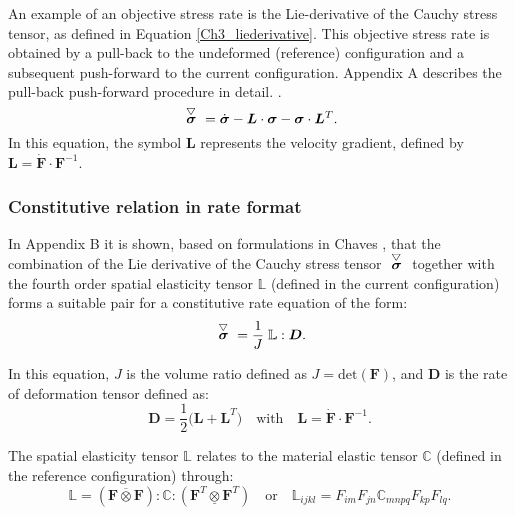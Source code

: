 An example of an objective stress rate is the Lie-derivative of the Cauchy stress tensor, as defined in Equation \ref{Ch3_liederivative}. This objective stress rate is obtained by a pull-back to the undeformed (reference) configuration and a subsequent push-forward to the current configuration. Appendix A describes the pull-back push-forward procedure in detail. {\color{red}{CREATE APPENDIX A WITH PULL BACK PUSH FORWARD}}. 
\begin{equation}\label{Ch3_liederivative}
    \acctriang{\boldsymbol{\sigma}} = \dot{\boldsymbol{\sigma}}-\boldsymbol{L}\cdot\boldsymbol{\sigma}-\boldsymbol{\sigma}\cdot\boldsymbol{L}^T.
\end{equation}
In this equation, the symbol $\boldsymbol{L}$ represents the velocity gradient, defined by $\boldsymbol{L}=\dot{\boldsymbol{F}}\cdot\boldsymbol{F}^{-1}$.


\subsubsection{Constitutive relation in rate format}
In Appendix B {\color{red}{Create APPENDIX B}} it is shown, based on formulations in Chaves \cite{chaves}, that the combination of the Lie derivative of the Cauchy stress tensor $\acctriang{\boldsymbol{\sigma}}$ together with the fourth order spatial elasticity tensor $\boldsymbol{\mathbb L}$ (defined in the current configuration) forms a suitable pair for a constitutive rate equation of the form:
\begin{equation}\label{Ch3_objrate}
    \acctriang{\boldsymbol{\sigma}} = \frac{1}{J}\;\boldsymbol{\mathbb L}:\boldsymbol{D}.
\end{equation}

In this equation, $J$ is the volume ratio defined as $J=\text{det}(\boldsymbol{F})$, and $\boldsymbol{D}$ is the rate of deformation tensor defined as:
\begin{equation}
\boldsymbol{D}=\frac{1}{2}\Big(\boldsymbol{L}+\boldsymbol{L}^T\Big) \quad\text{with}\quad \boldsymbol{L}=\dot{\boldsymbol{F}}\cdot\boldsymbol{F}^{-1}.
\end{equation}

The spatial elasticity tensor $\boldsymbol{\mathbb{L}}$ relates to the material elastic tensor $\boldsymbol{\mathbb C}$ (defined in the reference configuration) through:
\begin{equation}\label{Ch3_CL}
\boldsymbol{\mathbb{L}} = (\boldsymbol{F}\overline{\otimes}\boldsymbol{F}):\boldsymbol{\mathbb C}:(\boldsymbol{F}^T\underline{\otimes}\boldsymbol{F}^T) \quad \text{or} \quad \mathbb L_{ijkl} = F_{im}F_{jn}\mathbb C_{mnpq}F_{kp}F_{lq}.
\end{equation}

